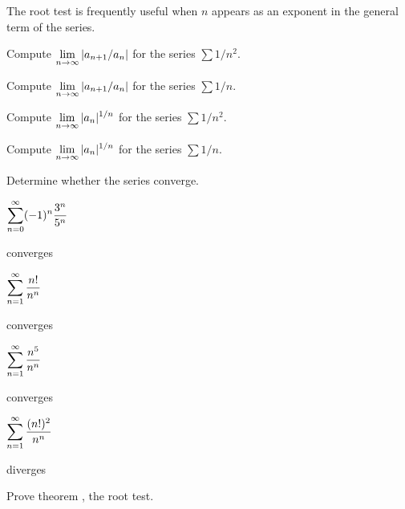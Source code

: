 The root test is frequently useful when $n$ appears as an exponent in
the general term of the series.

\begin{exercises}

\begin{exercise} Compute $\displaystyle\lim_{n\to\infty} |a_{n+1}/a_n|$ for the series
$\sum 1/n^2$.
\end{exercise}

\begin{exercise} Compute $\displaystyle\lim_{n\to\infty} |a_{n+1}/a_n|$ for the series
$\sum 1/n$.
\end{exercise}

\begin{exercise} Compute $\displaystyle\lim_{n\to\infty} |a_n|^{1/n}$ for the series
$\sum 1/n^2$.
\end{exercise}

\begin{exercise} Compute $\displaystyle\lim_{n\to\infty} |a_n|^{1/n}$ for the series
$\sum 1/n$.
\end{exercise}

Determine whether the series converge.

\begin{exercise} $\displaystyle\sum_{n=0}^\infty (-1)^{n}{3^n\over 5^n}$
\begin{answer} converges
\end{answer}\end{exercise}

\begin{exercise} $\displaystyle\sum_{n=1}^\infty {n!\over n^n}$
\begin{answer} converges
\end{answer}\end{exercise}

\begin{exercise} $\displaystyle\sum_{n=1}^\infty {n^5\over n^n}$
\begin{answer} converges
\end{answer}\end{exercise}

\begin{exercise} $\displaystyle\sum_{n=1}^\infty {(n!)^2\over n^n}$
\begin{answer} diverges
\end{answer}\end{exercise}

\begin{exercise} Prove theorem , the root test.\end{exercise}

\end{exercises}

